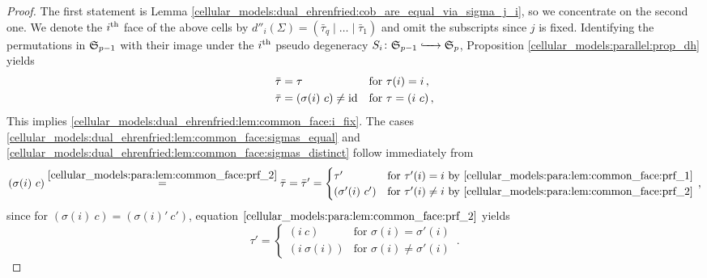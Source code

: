 \begin{proof}
    The first statement is Lemma \ref{cellular_models:dual_ehrenfried:cob_are_equal_via_sigma_j_i}, so we concentrate on the second one.
    We denote the $i^{\text{th}}$ face of the above cells by $d''_i( \Sigma ) = ( \bar \tau_q \mid \ldots \mid \bar \tau_1 )$ and omit the subscripts since $j$ is fixed.
    Identifying the permutations in $\mathfrak S_{p-1}$ with their image under the $i^{\text{th}}$ pseudo degeneracy $S_i \colon \mathfrak S_{p-1} \xhookrightarrow{\hspace{6pt}{}\hspace{6pt}} \mathfrak S_p$,
    Proposition \ref{cellular_models:parallel:prop_dh} yields
    \begin{align}
        \label{cellular_models:para:lem:common_face:prf_1} & \bar \tau = \tau                          & & \text{for } \tau(i) = i\,, \\
        \label{cellular_models:para:lem:common_face:prf_2} & \bar \tau = ( \sigma(i)\ c ) \neq \id     & & \text{for } \tau = (i\ c)\,,
    \end{align}
    This implies \ref{cellular_models:dual_ehrenfried:lem:common_face:i_fix}.
    The cases \ref{cellular_models:dual_ehrenfried:lem:common_face:sigmas_equal} and \ref{cellular_models:dual_ehrenfried:lem:common_face:sigmas_distinct} follow immediately from
    \[
        ( \sigma(i)\ c ) \overset{\eqref{cellular_models:para:lem:common_face:prf_2}}{=}
            \bar \tau =
            \bar \tau' = 
            \begin{cases}
                \tau' & \text{for } \tau'(i) = i \text{ by \eqref{cellular_models:para:lem:common_face:prf_1}} \\
                ( \sigma'(i)\ c' ) & \text{for } \tau'(i) \neq i \text{ by \eqref{cellular_models:para:lem:common_face:prf_2}}
            \end{cases}\,,
    \]
    since for $( \sigma(i)\ c ) = ( \sigma(i)'\ c' )$, equation $\eqref{cellular_models:para:lem:common_face:prf_2}$ yields
    \[
        \tau' = \begin{cases} (i\ c) & \text{for } \sigma(i) = \sigma'(i) \\ (i\ \sigma(i)) & \text{for } \sigma(i) \neq \sigma'(i) \end{cases}\,.
    \]
\end{proof}
